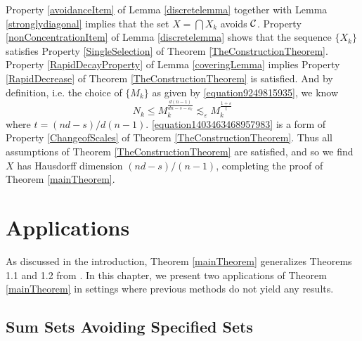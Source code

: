 Property \ref{avoidanceItem} of Lemma \ref{discretelemma} together with Lemma \ref{stronglydiagonal} implies that the set $X = \bigcap X_k$ avoids $\operatorname{\mathcal{C}}$. Property \ref{nonConcentrationItem} of Lemma \ref{discretelemma} shows that the sequence $\{ X_k \}$ satisfies Property \ref{SingleSelection} of Theorem \ref{TheConstructionTheorem}. Property \ref{RapidDecayProperty} of Lemma \ref{coveringLemma} implies Property \ref{RapidDecrease} of Theorem \ref{TheConstructionTheorem} is satisfied. And by definition, i.e. the choice of $\{ M_k \}$ as given by \eqref{equation9249815935}, we know
%
\begin{equation} \label{equation1403463468957983} N_k \leq M_k^{\frac{d(n-1)}{dn - s - \varepsilon_k}} \lesssim_\varepsilon M_k^{\frac{1 + \varepsilon}{t}} \end{equation}
%
where $t = (nd - s)/d(n-1)$. \eqref{equation1403463468957983} is a form of Property \ref{ChangeofScales} of Theorem \ref{TheConstructionTheorem}. Thus all assumptions of Theorem \ref{TheConstructionTheorem} are satisfied, and so we find $X$ has Hausdorff dimension $(nd - s)/(n-1)$, completing the proof of Theorem \ref{mainTheorem}.










\chapter{Applications} \label{ch:Applications}

As discussed in the introduction, Theorem \ref{mainTheorem} generalizes Theorems 1.1 and 1.2 from \cite{MalabikaRob}. In this chapter, we present two applications of Theorem \ref{mainTheorem} in settings where previous methods do not yield any results.

\section{Sum Sets Avoiding Specified Sets}

